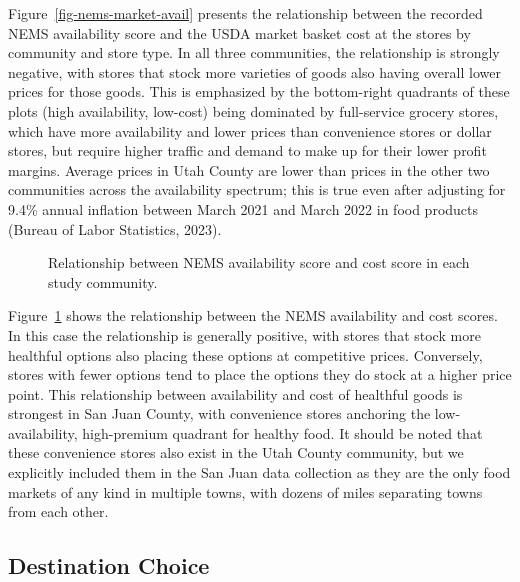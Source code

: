 \documentclass[
  letterpaper,
  number,
  review,
  3p]{elsarticle}
\begin{document}
Figure~\ref{fig-nems-market-avail} presents the relationship between the
recorded NEMS availability score and the USDA market basket cost at the
stores by community and store type. In all three communities, the
relationship is strongly negative, with stores that stock more varieties
of goods also having overall lower prices for those goods. This is
emphasized by the bottom-right quadrants of these plots (high
availability, low-cost) being dominated by full-service grocery stores,
which have more availability and lower prices than convenience stores or
dollar stores, but require higher traffic and demand to make up for
their lower profit margins. Average prices in Utah County are lower than
prices in the other two communities across the availability spectrum;
this is true even after adjusting for 9.4\% annual inflation between
March 2021 and March 2022 in food products (Bureau of Labor Statistics,
2023).

\begin{figure}


\caption{\label{fig-nems-cost-avail}Relationship between NEMS
availability score and cost score in each study community.}

\end{figure}%

Figure~\ref{fig-nems-cost-avail} shows the relationship between the NEMS
availability and cost scores. In this case the relationship is generally
positive, with stores that stock more healthful options also placing
these options at competitive prices. Conversely, stores with fewer
options tend to place the options they do stock at a higher price point.
This relationship between availability and cost of healthful goods is
strongest in San Juan County, with convenience stores anchoring the
low-availability, high-premium quadrant for healthy food. It should be
noted that these convenience stores also exist in the Utah County
community, but we explicitly included them in the San Juan data
collection as they are the only food markets of any kind in multiple
towns, with dozens of miles separating towns from each other.

\subsection{Destination Choice}\label{sec-estimation}
\end{document}

